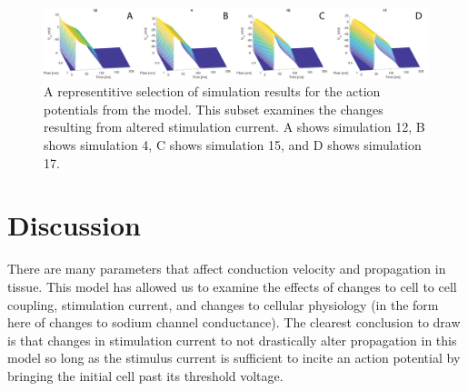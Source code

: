\documentclass[12pt]{article}
\begin{document}
\begin{figure}[H]
	\centering
	\includegraphics[width=\textwidth]{Figures/Fig3.png}
	\caption{A representitive selection of simulation results for the action potentials from the model. This subset examines the changes resulting from altered stimulation current. A shows simulation  12, B shows simulation 4, C shows simulation 15, and D shows simulation 17.}
	\label{fig:r3}
\end{figure}
\section{Discussion}
There are many parameters that affect conduction velocity and propagation in tissue. This model has allowed us to examine the effects of changes to cell to cell coupling, stimulation current, and changes to cellular physiology (in the form here of changes to sodium channel conductance). The clearest conclusion to draw is that changes in stimulation current to not drastically alter propagation in this model so long as the stimulus current is sufficient to incite an action potential by bringing the initial cell past its threshold voltage. 
\end{document}
